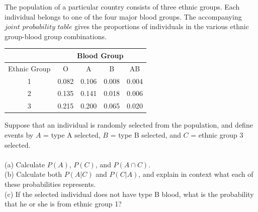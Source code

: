 \documentclass[12pt,letterpaper]{hmcpset}
\begin{document}
\begin{solution}

\end{solution}
\newpage

\begin{problem}[2.4.45]
The population of a particular country consists of three ethnic groups. Each individual belongs to one of the four major blood groups. The accompanying $\textit{joint probability table}$ gives the proportions of individuals in the various ethnic group-blood group combinations.\\
\begin{center}
	\begin{tabular}{|c||c|c|c|c|}
		\hline
		  & \multicolumn{4}{c|}{Blood Group}\\
 		\hline
 		\hline
 		Ethnic Group & O & A & B & AB \\
 		\hline
 		1 & 0.082 & 0.106 & 0.008 & 0.004 \\
 		2 & 0.135 & 0.141 & 0.018 & 0.006\\
 		3 & 0.215 & 0.200 & 0.065 & 0.020\\
 		 \hline
	 \end{tabular}

\end{center}
Suppose that an individual is randomly selected from the population, and define events by $A$ = {type A selected}, $B$ = {type B selected}, and $C$ = {ethnic group 3 selected}.
\\ \\
(a) Calculate $P(A)$, $P(C)$, and $P(A\cap C)$.
\\
	(b) Calculate both $P(A|C)$ and $P(C|A)$, and explain in context what each of these probabilities represents.
\\
(c) If the selected individual does not have type B blood, what is the probability that he or she is from ethnic group 1?

\end{problem}

\begin{solution}

\end{solution}
\newpage
\end{document}

